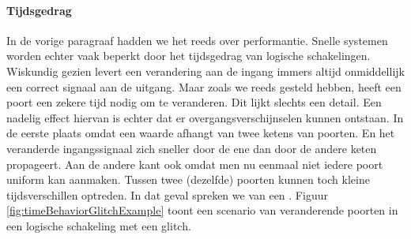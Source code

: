 \paragraph{Tijdsgedrag}In de vorige paragraaf hadden we het reeds over performantie. Snelle systemen worden echter vaak beperkt door het tijdsgedrag van logische schakelingen. Wiskundig gezien levert een verandering aan de ingang immers altijd onmiddellijk een correct signaal aan de uitgang. Maar zoals we reeds gesteld hebben, heeft een poort een zekere tijd nodig om te veranderen. Dit lijkt slechts een detail. Een nadelig effect hiervan is echter dat er overgangsverschijnselen kunnen ontstaan. In de eerste plaats omdat een waarde afhangt van twee ketens van poorten. En het veranderde ingangssignaal zich sneller door de ene dan door de andere keten propageert. Aan de andere kant ook omdat men nu eenmaal niet iedere poort uniform kan aanmaken. Tussen twee (dezelfde) poorten kunnen toch kleine tijdsverschillen optreden. In dat geval spreken we van een . Figuur \ref{fig:timeBehaviorGlitchExample} toont een scenario van veranderende poorten in een logische schakeling met een  glitch.
